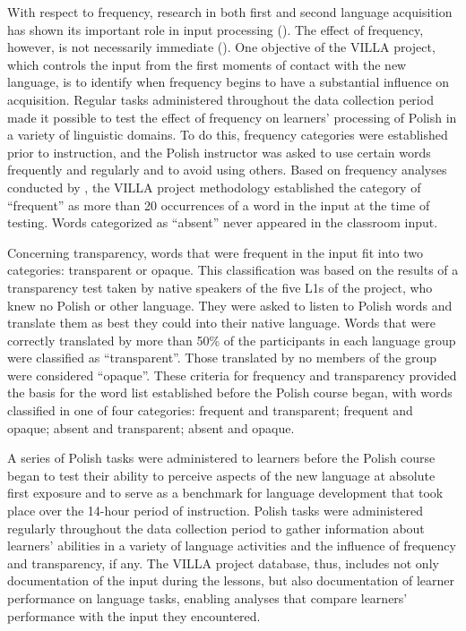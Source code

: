 \documentclass[output=paper,colorlinks,citecolor=brown,modfonts,nonflat]{../langscibook}
\begin{document}
With respect to frequency, research in both first and second language acquisition has shown its important role in input processing (\citealt{Slobin1985, BraineEtAl1990, Rott1999, Ellis2002, GullbergEtAl2010}). The effect of frequency, however, is not necessarily immediate (\citealt{Slobin1985,Rast2008}). One objective of the VILLA project, which controls the input from the first moments of contact with the new language, is to identify when frequency begins to have a substantial influence on acquisition. Regular tasks administered throughout the data collection period made it possible to test the effect of frequency on learners’ processing of Polish in a variety of linguistic domains. To do this, frequency categories were established prior to instruction, and the Polish instructor was asked to use certain words frequently and regularly and to avoid using others. Based on frequency analyses conducted by \citet{GoldschneiderDeKeyser2001}, the VILLA project methodology established the category of “frequent” as more than 20 occurrences of a word in the input at the time of testing. Words categorized as “absent” never appeared in the classroom input.

Concerning transparency, words that were frequent in the input fit into two categories: transparent or opaque. This classification was based on the results of a transparency test taken by native speakers of the five L1s of the project, who knew no Polish or other  language. They were asked to listen to Polish words and translate them as best they could into their native language. Words that were correctly translated by more than 50\% of the participants in each language group were classified as “transparent”. Those translated by no members of the group were considered “opaque”. These criteria for frequency and transparency provided the basis for the word list established before the Polish course began, with words classified in one of four categories: frequent and transparent; frequent and opaque; absent and transparent; absent and opaque.

A series of Polish tasks were administered to learners before the Polish course began to test their ability to perceive aspects of the new language at absolute first exposure and to serve as a benchmark for language development that took place over the 14-hour period of instruction. Polish tasks were administered regularly throughout the data collection period to gather information about learners’ abilities in a variety of language activities and the influence of frequency and transparency, if any. The VILLA project database, thus, includes not only documentation of the input during the lessons, but also documentation of learner performance on language tasks, enabling analyses that compare learners’ performance with the input they encountered.
\end{document}
